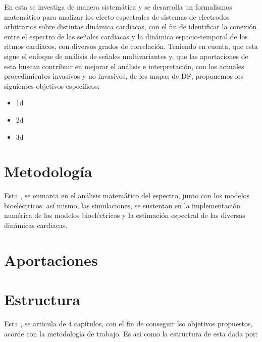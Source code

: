 En esta \nombreDoc se investiga de manera sistemática y se desarrolla un
formalismos matemático para analizar los efecto espectrales de sistemas de
electrodos arbitrarios sobre distintas dinámica cardiacas, con el fin de
identificar la conexión entre el espectro de las señales cardiacas  y la
dinámica espacio-temporal de los ritmos cardíacos, con diversos grados de
correlación. Teniendo en cuenta,  que esta \nombreDoc sigue el
enfoque de análisis de señales multivariantes y, que las aportaciones de esta
\nombreDoc buscan contribuir en mejorar el análisis e interpretación,  con los
actuales procedimientos invasivos y no invasivos, de los mapas de \ac{DF},
proponemos los siguientes objetivos específicos:

\begin{itemize}
\item 1d
\item 2d
\item 3d
\end{itemize}


\section{Metodología}
Esta \nombreDoc, se enmarca en el análisis matemático del espectro, junto con
los modelos bioeléctricos. así mismo, las simulaciones, se sustentan en la
implementación numérica de los modelos  bioeléctricos y la estimación espectral
de las diversas  dinámicas cardiacas.

\section{Aportaciones}

\section{Estructura}

Esta \nombreDoc, se  articula de 4 capítulos, con el fin de conseguir lso
objetivos propuestos, acorde con la metodología de trabajo. Es asi como la
estructura de \nombreDoc esta dada por:


